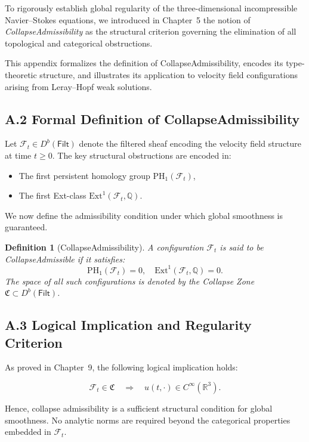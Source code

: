 \documentclass[11pt]{article}
\newtheorem{definition}[theorem]{Definition}
\begin{document}
To rigorously establish global regularity of the three-dimensional incompressible Navier--Stokes equations, we introduced in Chapter~5 the notion of \emph{CollapseAdmissibility} as the structural criterion governing the elimination of all topological and categorical obstructions.

This appendix formalizes the definition of CollapseAdmissibility, encodes its type-theoretic structure, and illustrates its application to velocity field configurations arising from Leray--Hopf weak solutions.

\subsection{A.2 Formal Definition of CollapseAdmissibility}

Let \( \mathcal{F}_t \in D^b(\mathsf{Filt}) \) denote the filtered sheaf encoding the velocity field structure at time \( t \geq 0 \). The key structural obstructions are encoded in:

\begin{itemize}
  \item The first persistent homology group \( \mathrm{PH}_1(\mathcal{F}_t) \),
  \item The first Ext-class \( \mathrm{Ext}^1(\mathcal{F}_t, \mathbb{Q}) \).
\end{itemize}

We now define the admissibility condition under which global smoothness is guaranteed.

\begin{definition}[CollapseAdmissibility]
A configuration \( \mathcal{F}_t \) is said to be \emph{CollapseAdmissible} if it satisfies:
\[
\mathrm{PH}_1(\mathcal{F}_t) = 0, \quad \mathrm{Ext}^1(\mathcal{F}_t, \mathbb{Q}) = 0.
\]
The space of all such configurations is denoted by the \emph{Collapse Zone} \( \mathfrak{C} \subset D^b(\mathsf{Filt}) \).
\end{definition}

\subsection{A.3 Logical Implication and Regularity Criterion}

As proved in Chapter~9, the following logical implication holds:

\[
\mathcal{F}_t \in \mathfrak{C} \quad \Longrightarrow \quad u(t, \cdot) \in C^\infty(\mathbb{R}^3).
\]

Hence, collapse admissibility is a sufficient structural condition for global smoothness. No analytic norms are required beyond the categorical properties embedded in \( \mathcal{F}_t \).
\end{document}
